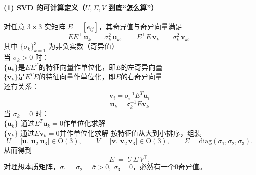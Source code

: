 \documentclass[../main.tex]{subfiles}
\begin{document}
\begin{enumerate}
\begin{itemize}
\begin{enumerate}
\begin{itemize}
\begin{itemize}
\begin{small}
\begin{itemize}
\paragraph{(1) SVD 的可计算定义（$U,\Sigma,V$ 到底“怎么算”）}
对任意 $3{\times}3$ 实矩阵 $E=[e_{ij}]$，其奇异值与奇异向量满足
\[
EE^\top\,\mathbf{u}_k \;=\; \sigma_k^2\,\mathbf{u}_k,\qquad
E^\top E\,\mathbf{v}_k \;=\; \sigma_k^2\,\mathbf{v}_k,
\]
其中 $\{\sigma_k\}_{k=1}^3$ 为非负实数（奇异值）\\
当 $\sigma_k>0$ 时：
\\$\{\mathbf{u}_k\}$是$EE^T$的特征向量作单位化，即$E$的左奇异向量
\\$\{\mathbf{v}_k\}$是$E^TE$的特征向量作单位化，即$E$的右奇异向量
\\还有关系：
$$\mathbf{v}_i=\sigma_i^{-1}E^T\mathbf{u}_i$$
$$\mathbf{u}_k=\sigma_k^{-1}E\mathbf{v}_k$$
当 $\sigma_k=0$ 时：
\\$\{\mathbf{u}_k\}$ 通过$E^T\mathbf{u}_k=0$作单位化求解
\\$\{\mathbf{v}_k\}$ 通过$E\mathbf{v}_k=0$并作单位化求解
按特征值从大到小排序，组装
\[
U=\big[\mathbf{u}_1\ \mathbf{u}_2\ \mathbf{u}_3\big]\in\mathrm{O}(3),\qquad
V=\big[\mathbf{v}_1\ \mathbf{v}_2\ \mathbf{v}_3\big]\in\mathrm{O}(3),\qquad
\Sigma=\mathrm{diag}(\sigma_1,\sigma_2,\sigma_3).
\]
从而得到
\[
E \;=\; U\,\Sigma\,V^\top.
\]
对理想本质矩阵，$\sigma_1=\sigma_2=\bar{\sigma}>0,\ \sigma_3=0$，必然有一个0奇异值。


\end{itemize}
\end{small}
\end{itemize}
\end{itemize}
\end{enumerate}
\end{itemize}
\end{enumerate}
\end{document}
